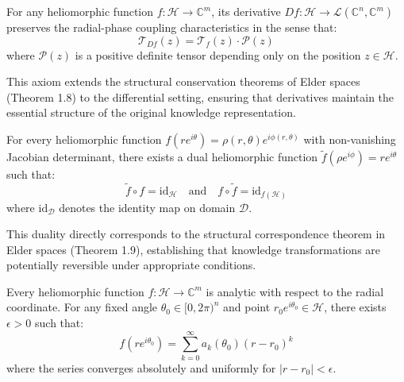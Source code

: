 \begin{axiom}
For any heliomorphic function $f: \mathcal{H} \rightarrow \mathbb{C}^m$, its derivative $Df: \mathcal{H} \rightarrow \mathcal{L}(\mathbb{C}^n, \mathbb{C}^m)$ preserves the radial-phase coupling characteristics in the sense that:
\begin{equation}
\mathcal{T}_{Df}(z) = \mathcal{T}_f(z) \cdot \mathcal{P}(z)
\end{equation}
where $\mathcal{P}(z)$ is a positive definite tensor depending only on the position $z \in \mathcal{H}$.
\end{axiom}

\begin{remark}
This axiom extends the structural conservation theorems of Elder spaces (Theorem 1.8) to the differential setting, ensuring that derivatives maintain the essential structure of the original knowledge representation.
\end{remark}

\begin{axiom}
For every heliomorphic function $f(re^{i\theta}) = \rho(r,\theta)e^{i\phi(r,\theta)}$ with non-vanishing Jacobian determinant, there exists a dual heliomorphic function $\tilde{f}(\rho e^{i\phi}) = re^{i\theta}$ such that:
\begin{equation}
\tilde{f} \circ f = \text{id}_{\mathcal{H}} \quad \text{and} \quad f \circ \tilde{f} = \text{id}_{f(\mathcal{H})}
\end{equation}
where $\text{id}_{\mathcal{D}}$ denotes the identity map on domain $\mathcal{D}$.
\end{axiom}

\begin{remark}
This duality directly corresponds to the structural correspondence theorem in Elder spaces (Theorem 1.9), establishing that knowledge transformations are potentially reversible under appropriate conditions.
\end{remark}

\begin{axiom}
Every heliomorphic function $f: \mathcal{H} \rightarrow \mathbb{C}^m$ is analytic with respect to the radial coordinate. For any fixed angle $\theta_0 \in [0, 2\pi)^n$ and point $r_0e^{i\theta_0} \in \mathcal{H}$, there exists $\epsilon > 0$ such that:
\begin{equation}
f(re^{i\theta_0}) = \sum_{k=0}^{\infty} a_k(\theta_0)(r-r_0)^k
\end{equation}
where the series converges absolutely and uniformly for $|r-r_0| < \epsilon$.
\end{axiom}

